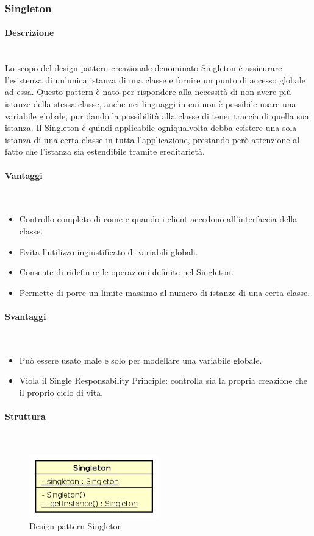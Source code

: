 \subsubsection{Singleton}
\paragraph{Descrizione} \mbox{} \\
Lo scopo del design pattern creazionale denominato Singleton è assicurare l’esistenza di un'unica istanza di una classe e fornire un punto di accesso globale ad essa. Questo pattern è nato per rispondere alla necessità di non avere più istanze della stessa classe, anche nei linguaggi in cui non è possibile usare una variabile globale, pur dando la possibilità alla classe di tener traccia di quella sua istanza. Il Singleton è quindi applicabile ogniqualvolta debba esistere una sola istanza di una certa classe in tutta l’applicazione, prestando però attenzione al fatto che l’istanza sia estendibile tramite ereditarietà.
\paragraph{Vantaggi} \mbox{} \\
\begin{itemize}
\item Controllo completo di come e quando i client accedono all’interfaccia della classe.
\item Evita l’utilizzo ingiustificato di variabili globali.
\item Consente di ridefinire le operazioni definite nel Singleton.
\item Permette di porre un limite massimo al numero di istanze di una certa classe.
\end{itemize}
\paragraph{Svantaggi} \mbox{} \\
\begin{itemize}
\item Può essere usato male e solo per modellare una variabile globale.
\item Viola il Single Responsability Principle: controlla sia la propria creazione che il proprio ciclo di vita.
\end{itemize}
\paragraph{Struttura} \mbox{} \\
\begin{figure}[H]
\centering
\includegraphics[width=0.5\textwidth]{res/sections/backend/singleton.png}
\caption{Design pattern Singleton}
\end{figure}
